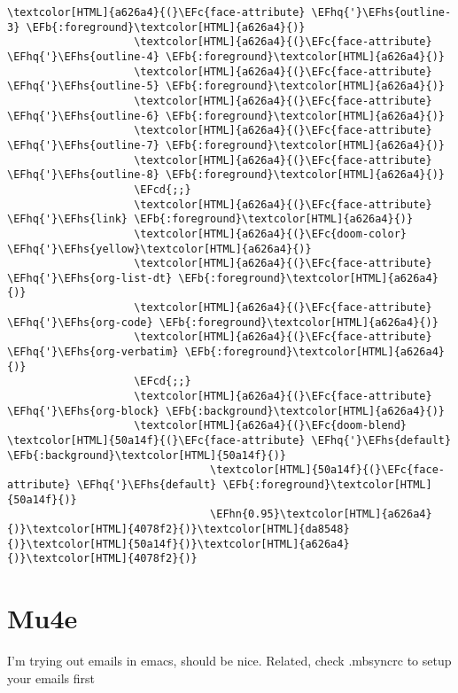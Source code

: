 \documentclass{scrartcl}
\newcommand{\EFb}[1]{\textcolor{EFb}{#1}} %
\newcommand{\EFc}[1]{\textcolor{EFc}{#1}} %
\newcommand{\EFcd}[1]{\textcolor{EFcd}{#1}} %
\newcommand{\EFhn}[1]{\textcolor{EFhn}{\textbf{#1}}} %
\newcommand{\EFhq}[1]{\textcolor{EFhq}{#1}} %
\newcommand{\EFhs}[1]{\textcolor{EFhs}{#1}} %
\begin{document}
\begin{enumerate}
\begin{Code}
\begin{Verbatim}[]
                    \textcolor[HTML]{a626a4}{(}\EFc{face-attribute} \EFhq{'}\EFhs{outline-3} \EFb{:foreground}\textcolor[HTML]{a626a4}{)}
                    \textcolor[HTML]{a626a4}{(}\EFc{face-attribute} \EFhq{'}\EFhs{outline-4} \EFb{:foreground}\textcolor[HTML]{a626a4}{)}
                    \textcolor[HTML]{a626a4}{(}\EFc{face-attribute} \EFhq{'}\EFhs{outline-5} \EFb{:foreground}\textcolor[HTML]{a626a4}{)}
                    \textcolor[HTML]{a626a4}{(}\EFc{face-attribute} \EFhq{'}\EFhs{outline-6} \EFb{:foreground}\textcolor[HTML]{a626a4}{)}
                    \textcolor[HTML]{a626a4}{(}\EFc{face-attribute} \EFhq{'}\EFhs{outline-7} \EFb{:foreground}\textcolor[HTML]{a626a4}{)}
                    \textcolor[HTML]{a626a4}{(}\EFc{face-attribute} \EFhq{'}\EFhs{outline-8} \EFb{:foreground}\textcolor[HTML]{a626a4}{)}
                    \EFcd{;;}
                    \textcolor[HTML]{a626a4}{(}\EFc{face-attribute} \EFhq{'}\EFhs{link} \EFb{:foreground}\textcolor[HTML]{a626a4}{)}
                    \textcolor[HTML]{a626a4}{(}\EFc{doom-color} \EFhq{'}\EFhs{yellow}\textcolor[HTML]{a626a4}{)}
                    \textcolor[HTML]{a626a4}{(}\EFc{face-attribute} \EFhq{'}\EFhs{org-list-dt} \EFb{:foreground}\textcolor[HTML]{a626a4}{)}
                    \textcolor[HTML]{a626a4}{(}\EFc{face-attribute} \EFhq{'}\EFhs{org-code} \EFb{:foreground}\textcolor[HTML]{a626a4}{)}
                    \textcolor[HTML]{a626a4}{(}\EFc{face-attribute} \EFhq{'}\EFhs{org-verbatim} \EFb{:foreground}\textcolor[HTML]{a626a4}{)}
                    \EFcd{;;}
                    \textcolor[HTML]{a626a4}{(}\EFc{face-attribute} \EFhq{'}\EFhs{org-block} \EFb{:background}\textcolor[HTML]{a626a4}{)}
                    \textcolor[HTML]{a626a4}{(}\EFc{doom-blend} \textcolor[HTML]{50a14f}{(}\EFc{face-attribute} \EFhq{'}\EFhs{default} \EFb{:background}\textcolor[HTML]{50a14f}{)}
                                \textcolor[HTML]{50a14f}{(}\EFc{face-attribute} \EFhq{'}\EFhs{default} \EFb{:foreground}\textcolor[HTML]{50a14f}{)}
                                \EFhn{0.95}\textcolor[HTML]{a626a4}{)}\textcolor[HTML]{4078f2}{)}\textcolor[HTML]{da8548}{)}\textcolor[HTML]{50a14f}{)}\textcolor[HTML]{a626a4}{)}\textcolor[HTML]{4078f2}{)}
\end{Verbatim}
\end{Code}
\end{enumerate}

\section{Mu4e}
\label{sec:orgad6865a}
I'm trying out emails in emacs, should be nice. Related, check .mbsyncrc to
setup your emails first
\end{document}
